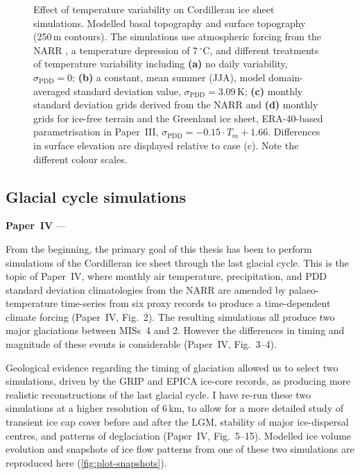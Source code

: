\documentclass{article}
\newcommand{\sPDD}[0]{\sigma_{\mathrm{PDD}}}
\newcommand{\unit}[1]{\ensuremath{\mathrm{#1}}}
\newcommand{\degree}[0]{\ensuremath{^{\circ}}}
\newcommand{\degC}[0]{\unit{{\degree}C}}
\newcommand{\PSDP}[0]{Paper~III}    %
\newcommand{\CCYC}[0]{Paper~IV}     %
\begin{document}
\begin{figure}
  \centering
  \caption{Effect of temperature variability on Cordilleran ice sheet
           simulations. Modelled basal topography and surface topography
           (250\,m contours). The simulations use atmospheric forcing from the
           NARR \citep{Mesinger.etal.2006}, a temperature depression of
           7\,\degC, and different treatments of temperature variability
           including
           \textbf{(a)} no daily variability, $\sPDD=0$;
           \textbf{(b)} a constant, mean summer (JJA), model domain-averaged
           standard deviation value, $\sPDD=3.09$\,K;
           \textbf{(c)} monthly standard deviation grids derived from the NARR
           and
           \textbf{(d)} monthly grids for ice-free terrain and the
           Greenland ice sheet, ERA-40-based \citep{Uppala.etal.2005}
           parametrisation in \PSDP, ${\sPDD=-0.15\cdot{T_m}+1.66}$.
           Differences in surface elevation are displayed relative to case (c).
           Note the different colour scales.}
  \label{fig:plot-sdeffect}
\end{figure}


\subsection{Glacial cycle simulations}

\noindent\textbf{\CCYC} --- 
\bigskip

From the beginning, the primary goal of this thesis has been to perform
simulations of the Cordilleran ice sheet through the last glacial cycle. This
is the topic of \CCYC, where monthly air temperature, precipitation, and PDD
standard deviation climatologies from the NARR are amended by
palaeo-temperature time-series from six proxy records to produce a
time-dependent climate forcing (\CCYC, Fig.~2). The resulting simulations all
produce two major glaciations between MISs~4 and 2. However the differences in
timing and magnitude of these events is considerable (\CCYC, Fig.~3--4).

Geological evidence regarding the timing of glaciation allowed us to select two
simulations, driven by the GRIP \citep{Dansgaard.etal.1993} and EPICA
\citep{Jouzel.etal.2007} ice-core records, as producing more realistic
reconstructions of the last glacial cycle. I have re-run these two simulations
at a higher resolution of 6\,km, to allow for a more detailed study of
transient ice cap cover before and after the LGM, stability of major
ice-dispersal centres, and patterns of deglaciation (\CCYC, Fig.~5--15).
Modelled ice volume evolution and snapshots of ice flow patterns from one of
these two simulations are reproduced here (\cref{fig:plot-snapshots}).
\end{document}
